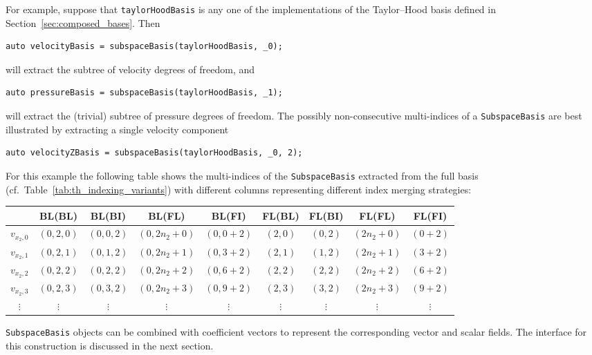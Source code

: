 \documentclass[a4paper,10pt,headings=normal,bibliography=totoc]{scrartcl}
\newcommand{\cpp}[1]{\lstinline[basicstyle=\ttfamily]!#1!}
\begin{document}
For example, suppose that \cpp{taylorHoodBasis} is any one of the implementations
of the Taylor--Hood basis defined in Section~\ref{sec:composed_bases}.
Then
\begin{lstlisting}[style=Example]
auto velocityBasis = subspaceBasis(taylorHoodBasis, _0);
\end{lstlisting}
will extract the subtree of velocity degrees of freedom, and
\begin{lstlisting}[style=Example]
auto pressureBasis = subspaceBasis(taylorHoodBasis, _1);
\end{lstlisting}
will extract the (trivial) subtree of pressure degrees of freedom.
The possibly non-consecutive multi-indices of a \cpp{SubspaceBasis} are
best illustrated by extracting a single velocity component
\begin{lstlisting}[style=Example]
auto velocityZBasis = subspaceBasis(taylorHoodBasis, _0, 2);
\end{lstlisting}
For this example the following table shows the multi-indices
of the \cpp{SubspaceBasis} extracted from the full basis
(cf.\ Table~\ref{tab:th_indexing_variants})
with different columns representing different index merging strategies:
\begin{center}
\footnotesize
\begin{tabular}{c|c|c|c|c|c|c|c|c}
    & BL(BL)
    & BL(BI)
    & BL(FL)
    & BL(FI)
    & FL(BL)
    & FL(BI)
    & FL(FL)
    & FL(FI)
    \\
  \hline
  $v_{x_2,0}$
    & $(0,2,0)$
    & $(0,0,2)$
    & $(0,2n_2+0)$
    & $(0,0+2)$
    & $(2,0)$
    & $(0,2)$
    & $(2n_2+0)$
    & $(0+2)$
    \\
  $v_{x_2,1}$
    & $(0,2,1)$
    & $(0,1,2)$
    & $(0,2n_2+1)$
    & $(0,3+2)$
    & $(2,1)$
    & $(1,2)$
    & $(2n_2+1)$
    & $(3+2)$
    \\
  $v_{x_2,2}$
    & $(0,2,2)$
    & $(0,2,2)$
    & $(0,2n_2+2)$
    & $(0,6+2)$
    & $(2,2)$
    & $(2,2)$
    & $(2n_2+2)$
    & $(6+2)$
    \\
  $v_{x_2,3}$
    & $(0,2,3)$
    & $(0,3,2)$
    & $(0,2n_2+3)$
    & $(0,9+2)$
    & $(2,3)$
    & $(3,2)$
    & $(2n_2+3)$
    & $(9+2)$
    \\
  $\vdots$ & $\vdots$ & $\vdots$ & $\vdots$ &  $\vdots$ & $\vdots$ & $\vdots$ & $\vdots$ & $\vdots$
  \\
  \hline
\end{tabular}
\end{center}


\cpp{SubspaceBasis} objects can be combined with
coefficient vectors to represent the corresponding vector and scalar fields.
The interface for this construction is discussed in the next section.
\end{document}
